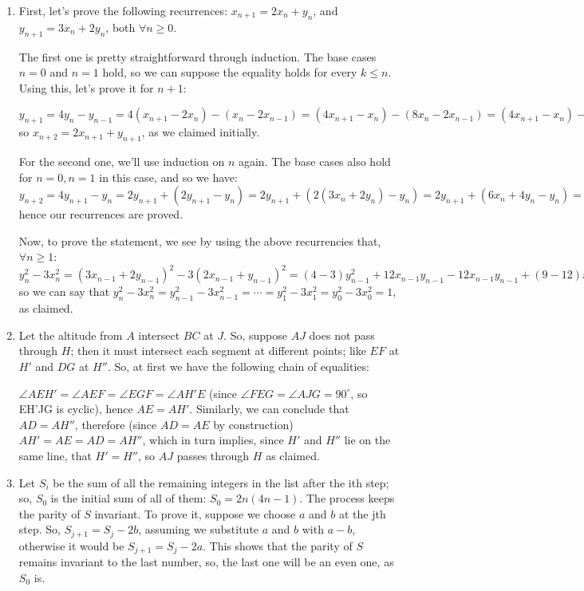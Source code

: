 \documentclass{article}
\begin{document}
\begin{enumerate}
\item
First, let's prove the following recurrences:
$x_{n + 1} = 2x_n + y_n$, and $y_{n + 1} = 3x_n + 2y_n$,
both $\forall n \geq 0$.

The first one is pretty straightforward through induction.
The base cases $n = 0$ and $n = 1$ hold, so we can suppose
the equality holds for every $k \leq n$. Using this, let's
prove it for $n + 1$:

$
    y_{n + 1} = 4y_n - y_{n - 1} = 
    4(x_{n + 1} - 2x_n) - (x_n - 2x_{n - 1}) =
    (4x_{n + 1} - x_n) - (8x_n - 2x_{n - 1}) =
    (4x_{n + 1} - x_n) - 2(4x_n - x_{n - 1}) =
    x_{n + 2} - 2x_{n + 1},
$
so $x_{n + 2} = 2x_{n + 1} + y_{n + 1}$, as we claimed
initially.

For the second one, we'll use induction on $n$ again. The
base cases also hold for $n = 0, n = 1$ in this case, and
so we have:
$
    y_{n + 2} = 4y_{n + 1} - y_n = 
    2y_{n + 1} + (2y_{n + 1} - y_n) =
    2y_{n + 1} + (2(3x_n + 2y_n) - y_n) =
    2y_{n + 1} + (6x_n + 4y_n - y_n) =
    2y_{n + 1} + 3(2x_n + y_n) =
    2y_{n + 1} + 3x_{n + 1},
$
hence our recurrences are proved.

Now, to prove the statement, we see by using the above
recurrencies that, $\forall n \geq 1$:
$
    y_n^2 - 3x_n^2 =
    (3x_{n - 1} + 2y_{n - 1})^2 - 3(2x_{n - 1} + y_{n - 1})^2 =
    (4 - 3)y_{n - 1}^2 + 12 x_{n - 1} y_{n - 1} -
    12 x_{n - 1} y_{n - 1} + (9 - 12)x_{n - 1}^2 =
    y_{n - 1}^2 - 3x_{n - 1}^2,
$
so we can say that
$
    y_n^2 - 3x_n^2 = y_{n - 1}^2 - 3x_{n - 1}^2 =
    \cdots = y_1^2 - 3x_1^2 = y_0^2 - 3x_0^2 = 1,
$
as claimed.

\item
Let the altitude from $A$ intersect $BC$ at $J$. So, suppose $AJ$ does not
pass through $H$; then it must intersect each segment at different points;
like $EF$ at $H'$ and $DG$ at $H''$. So, at first we have the following
chain of equalities:


$\angle AEH' = \angle AEF = \angle EGF = \angle AH'E$ (since $\angle FEG =
\angle AJG = 90^{\circ}$, so EH'JG is cyclic), hence $AE = AH'$. Similarly, we
can conclude that $AD = AH''$, therefore (since $AD = AE$ by construction)
$AH' = AE = AD = AH''$, which in turn implies, since $H'$ and $H''$ lie on
the same line, that $H' = H''$, so $AJ$ passes through $H$ as claimed.

\item
Let $S_i$ be the sum of all the remaining integers in the list after the ith
step; so, $S_0$ is the initial sum of all of them: $S_0 = 2n(4n - 1)$. The
process keeps the parity of $S$ invariant. To prove it, suppose we choose
$a$ and $b$ at the jth step. So, $S_{j + 1} = S_j - 2b$, assuming we
substitute $a$ and $b$ with $a - b$, otherwise it would be $S_{j + 1} = S_j
- 2a$. This shows that the parity of $S$ remains invariant to the last
number, so, the last one will be an even one, as $S_0$ is.


\end{enumerate}
\end{document}
